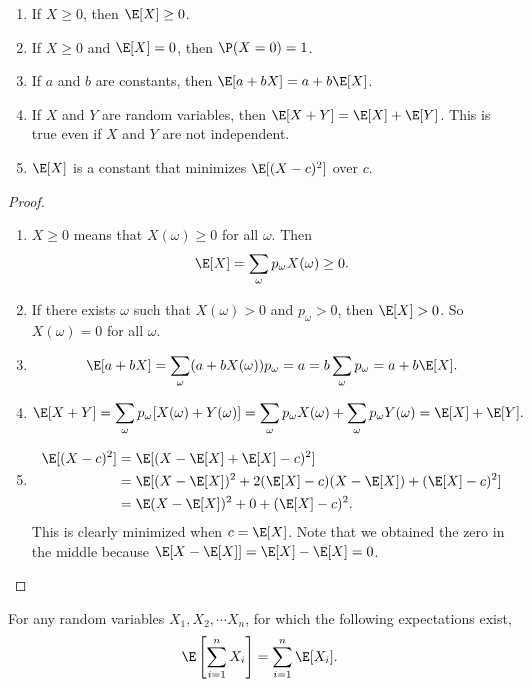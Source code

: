 \documentclass[a4paper]{article}
\begin{document}
\begin{thm}\leavevmode
\begin{enumerate}
  \item If $X \geq 0$, then $\E[X] \geq 0$.
  \item If $X\geq 0$ and $\E[X] = 0$, then $\P(X = 0) = 1$.
  \item If $a$ and $b$ are constants, then $\E[a + bX] = a + b\E[X]$.
  \item If $X$ and $Y$ are random variables, then $\E[X + Y] = \E[X] + \E[Y]$. This is true even if $X$ and $Y$ are not independent.
  \item $\E[X]$ is a constant that minimizes $\E[(X - c)^2]$ over $c$.
\end{enumerate}
\end{thm}
\begin{proof}\leavevmode
  \begin{enumerate}
    \item $X \geq 0$ means that $X(\omega) \geq 0$ for all $\omega$. Then
      \[
        \E[X] = \sum_\omega p_\omega X(\omega) \geq 0.
      \]
    \item If there exists $\omega$ such that $X(\omega) > 0$ and $p_\omega > 0$, then $\E[X] > 0$. So $X(\omega) = 0$ for all $\omega$.
    \item
      \[
        \E[a + bX] = \sum_\omega (a + bX(\omega))p_\omega = a = b\sum_\omega p_\omega= a + b\E[X].
      \]
    \item
      \[ \E[X + Y] = \sum_\omega p_\omega[X(\omega) + Y(\omega)] = \sum_\omega p_\omega X(\omega) + \sum_\omega p_\omega Y(\omega) = \E[X] + \E[Y].
      \]
    \item
      \begin{align*}
        \E[(X - c)^2] &= \E[(X - \E[X] + \E[X] - c)^2]\\
        &= \E[(X - \E[X])^2 + 2(\E[X] - c)(X - \E[X]) + (\E[X] - c)^2]\\
        &= \E(X - \E[X])^2 + 0 + (\E[X] - c)^2.
      \end{align*}
      This is clearly minimized when $c = \E[X]$. Note that we obtained the zero in the middle because $\E[X - \E[X]] = \E[X] - \E[X] = 0$.
  \end{enumerate}
\end{proof}
\begin{thm}
  For any random variables $X_1, X_2, \cdots X_n$, for which the following expectations exist,
  \[
    \E\left[\sum_{i = 1}^n X_i\right] = \sum_{i = 1}^n \E[X_i].
  \]
\end{thm}
\end{document}
